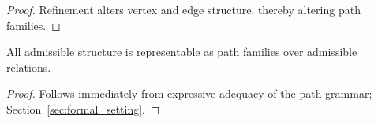 \begin{proof}
Refinement alters vertex and edge structure, thereby altering path families.
\end{proof}

\begin{corollary}
\label{cor:path_sufficiency}
All admissible structure is representable as path families over admissible relations.
\end{corollary}

\begin{proof}
Follows immediately from expressive adequacy of the path grammar;
Section~\ref{sec:formal_setting}.
\end{proof}
